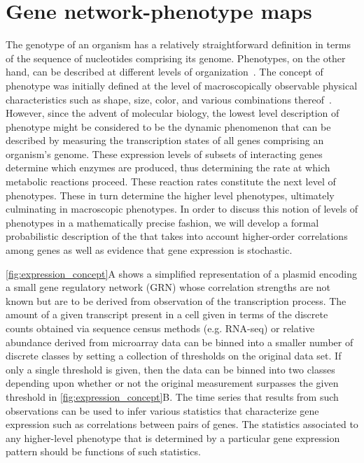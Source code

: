 
\section{Gene network-phenotype maps}\label{sec:genenetworkphenmap}
The genotype of an organism has a relatively straightforward definition in terms of the sequence of nucleotides comprising its genome. Phenotypes, on the other hand, can be described at different levels of organization~\cite{Dawkins1982,Stadler2001}. The concept of phenotype was initially defined at the level of macroscopically observable physical characteristics such as shape, size, color, and various combinations thereof~\cite{Johannsen1911}. However, since the advent of molecular biology, the lowest level description of phenotype might be considered to be the dynamic phenomenon that can be described by measuring the transcription states of all genes comprising an organism's genome.  These expression levels of subsets of interacting genes determine which enzymes are produced, thus determining the rate at which metabolic reactions proceed.  These reaction rates constitute the next level of phenotypes.  These in turn determine the higher level phenotypes, ultimately culminating in macroscopic phenotypes.  In order to discuss this notion of levels of phenotypes in a mathematically precise fashion, we will develop a formal probabilistic description of the \gnpm{} that takes into account higher-order correlations among genes as well as evidence that gene expression is stochastic.

\ref{fig:expression_concept}A shows a simplified representation of a plasmid encoding a small gene regulatory network (GRN) whose correlation strengths are not known but are to be derived from observation of the transcription process. The amount of a given transcript present in a cell given in terms of the discrete counts obtained via sequence census methods (e.g. RNA-seq) or relative abundance derived from microarray data can be binned into a smaller number of discrete classes by setting a collection of thresholds on the original data set. If only a single threshold is given, then the data can be binned into two classes depending upon whether or not the original measurement surpasses the given threshold in \ref{fig:expression_concept}B.
The time series that results from such observations can be used to infer various statistics that characterize gene expression such as correlations between pairs of genes. The statistics associated to any higher-level phenotype that is determined by a particular gene expression pattern should be functions of such statistics.

